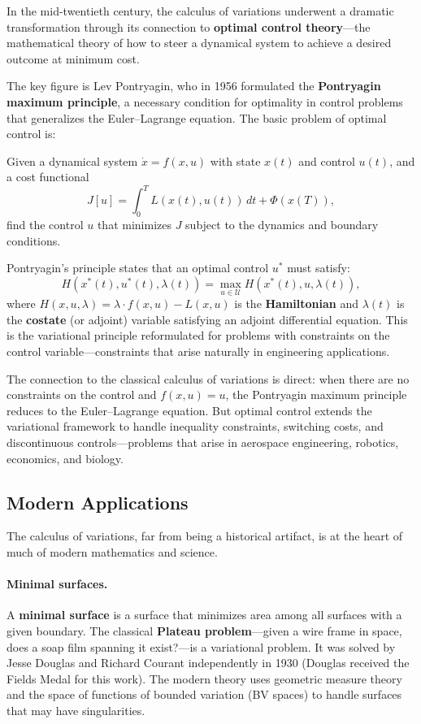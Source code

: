 In the mid-twentieth century, the calculus of variations underwent a dramatic transformation through its connection to \textbf{optimal control theory}---the mathematical theory of how to steer a dynamical system to achieve a desired outcome at minimum cost.

The key figure is Lev Pontryagin, who in 1956 formulated the \textbf{Pontryagin maximum principle}, a necessary condition for optimality in control problems that generalizes the Euler--Lagrange equation. The basic problem of optimal control is:

\begin{problem_statement}
Given a dynamical system $\dot{x} = f(x, u)$ with state $x(t)$ and control $u(t)$, and a cost functional
\[
    J[u] = \int_0^T L(x(t), u(t)) \, dt + \Phi(x(T)),
\]
find the control $u$ that minimizes $J$ subject to the dynamics and boundary conditions.
\end{problem_statement}

Pontryagin's principle states that an optimal control $u^*$ must satisfy:
\[
    H(x^*(t), u^*(t), \lambda(t)) = \max_{u \in \mathcal{U}} H(x^*(t), u, \lambda(t)),
\]
where $H(x, u, \lambda) = \lambda \cdot f(x, u) - L(x, u)$ is the \textbf{Hamiltonian} and $\lambda(t)$ is the \textbf{costate} (or adjoint) variable satisfying an adjoint differential equation. This is the variational principle reformulated for problems with constraints on the control variable---constraints that arise naturally in engineering applications.

The connection to the classical calculus of variations is direct: when there are no constraints on the control and $f(x, u) = u$, the Pontryagin maximum principle reduces to the Euler--Lagrange equation. But optimal control extends the variational framework to handle inequality constraints, switching costs, and discontinuous controls---problems that arise in aerospace engineering, robotics, economics, and biology.

\subsection{Modern Applications}

The calculus of variations, far from being a historical artifact, is at the heart of much of modern mathematics and science.

\paragraph{Minimal surfaces.}
A \textbf{minimal surface} is a surface that minimizes area among all surfaces with a given boundary. The classical \textbf{Plateau problem}---given a wire frame in space, does a soap film spanning it exist?---is a variational problem. It was solved by Jesse Douglas and Richard Courant independently in 1930 (Douglas received the Fields Medal for this work). The modern theory uses geometric measure theory and the space of functions of bounded variation (BV spaces) to handle surfaces that may have singularities.

